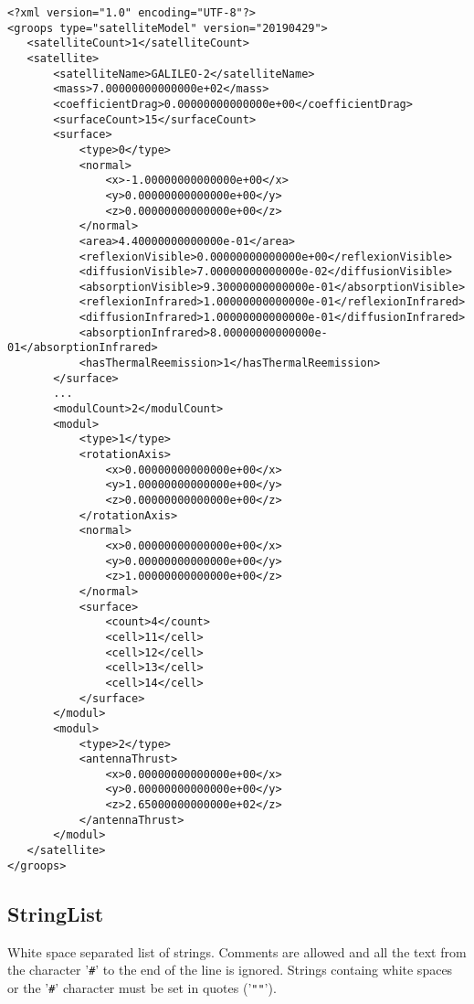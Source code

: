 \begin{verbatim}
<?xml version="1.0" encoding="UTF-8"?>
<groops type="satelliteModel" version="20190429">
   <satelliteCount>1</satelliteCount>
   <satellite>
       <satelliteName>GALILEO-2</satelliteName>
       <mass>7.00000000000000e+02</mass>
       <coefficientDrag>0.00000000000000e+00</coefficientDrag>
       <surfaceCount>15</surfaceCount>
       <surface>
           <type>0</type>
           <normal>
               <x>-1.00000000000000e+00</x>
               <y>0.00000000000000e+00</y>
               <z>0.00000000000000e+00</z>
           </normal>
           <area>4.40000000000000e-01</area>
           <reflexionVisible>0.00000000000000e+00</reflexionVisible>
           <diffusionVisible>7.00000000000000e-02</diffusionVisible>
           <absorptionVisible>9.30000000000000e-01</absorptionVisible>
           <reflexionInfrared>1.00000000000000e-01</reflexionInfrared>
           <diffusionInfrared>1.00000000000000e-01</diffusionInfrared>
           <absorptionInfrared>8.00000000000000e-01</absorptionInfrared>
           <hasThermalReemission>1</hasThermalReemission>
       </surface>
       ...
       <modulCount>2</modulCount>
       <modul>
           <type>1</type>
           <rotationAxis>
               <x>0.00000000000000e+00</x>
               <y>1.00000000000000e+00</y>
               <z>0.00000000000000e+00</z>
           </rotationAxis>
           <normal>
               <x>0.00000000000000e+00</x>
               <y>0.00000000000000e+00</y>
               <z>1.00000000000000e+00</z>
           </normal>
           <surface>
               <count>4</count>
               <cell>11</cell>
               <cell>12</cell>
               <cell>13</cell>
               <cell>14</cell>
           </surface>
       </modul>
       <modul>
           <type>2</type>
           <antennaThrust>
               <x>0.00000000000000e+00</x>
               <y>0.00000000000000e+00</y>
               <z>2.65000000000000e+02</z>
           </antennaThrust>
       </modul>
   </satellite>
</groops>
\end{verbatim}


\subsection{StringList}\label{general.fileFormat:stringList}
White space separated list of strings.
Comments are allowed and all the text from the character '\verb|#|' to the end of the line is ignored.
Strings containg white spaces or the '\verb|#|' character must be set in quotes ('\verb|""|').

